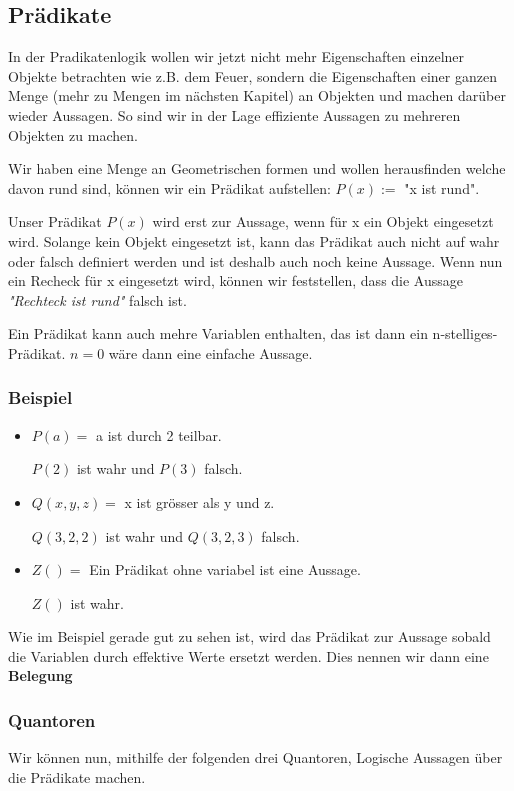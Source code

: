 \documentclass[a4paper,12pt]{article}
\begin{document}
\subsection{Prädikate}
In der Pradikatenlogik wollen wir jetzt nicht mehr Eigenschaften einzelner Objekte betrachten wie z.B. dem Feuer,
sondern die Eigenschaften einer ganzen Menge (mehr zu Mengen im nächsten Kapitel) an Objekten und machen darüber wieder Aussagen. So sind wir in der Lage effiziente Aussagen zu mehreren Objekten zu machen.

Wir haben eine Menge an Geometrischen formen und wollen herausfinden welche davon rund sind, können wir ein Prädikat aufstellen: \( P(x) := \) "x ist rund".


Unser Prädikat \( P(x) \) wird erst zur Aussage, wenn für x ein Objekt eingesetzt wird. Solange kein Objekt eingesetzt ist, kann das Prädikat auch nicht auf wahr oder falsch definiert werden und ist deshalb auch noch keine Aussage. Wenn nun ein Recheck für x eingesetzt wird, können wir feststellen, dass die Aussage \textit{"Rechteck ist rund"} falsch ist.

Ein Prädikat kann auch mehre Variablen enthalten, das ist dann ein n-stelliges-Prädikat. \( n = 0 \) wäre dann eine einfache Aussage.


\subsubsection*{Beispiel}
\begin{itemize}
  \item \(P(a) = \)  a ist durch 2 teilbar.
 
  \(P(2) \) ist wahr und \(P(3)\) falsch.
  \item \(Q(x, y, z) = \) x ist grösser als y und z.
 
  \(Q(3, 2, 2) \) ist wahr und \(Q(3, 2, 3)\) falsch.
  \item \(Z() = \) Ein Prädikat ohne variabel ist eine Aussage.
 
  \(Z() \) ist wahr.
\end{itemize}

Wie im Beispiel gerade gut zu sehen ist, wird das Prädikat zur Aussage sobald die Variablen durch effektive Werte ersetzt werden. Dies nennen wir dann eine \textbf{Belegung}
\newpage
\subsubsection{Quantoren}
Wir können nun, mithilfe der folgenden drei Quantoren, Logische Aussagen über die Prädikate machen.
\end{document}
